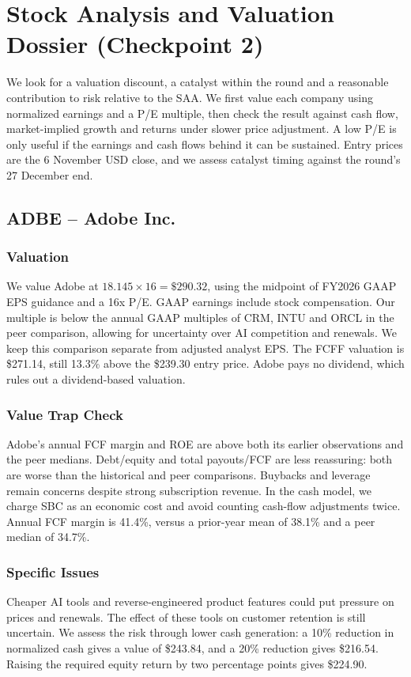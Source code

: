 \documentclass[10pt,a4paper]{article}
\begin{document}
\clearpage
\section{Stock Analysis and Valuation Dossier (Checkpoint 2)}
\label{sec:cp2}

We look for a valuation discount, a catalyst within the round and a reasonable contribution to risk relative to the SAA. We first value each company using normalized earnings and a P/E multiple, then check the result against cash flow, market-implied growth and returns under slower price adjustment. A low P/E is only useful if the earnings and cash flows behind it can be sustained. Entry prices are the 6 November USD close, and we assess catalyst timing against the round's 27 December end.


\subsection{ADBE -- Adobe Inc.}

\subsubsection*{Valuation}
We value Adobe at $18.145\times16=\$290.32$, using the midpoint of FY2026 GAAP EPS guidance and a 16x P/E. GAAP earnings include stock compensation. Our multiple is below the annual GAAP multiples of CRM, INTU and ORCL in the peer comparison, allowing for uncertainty over AI competition and renewals. We keep this comparison separate from adjusted analyst EPS. The FCFF valuation is \$271.14, still 13.3\% above the \$239.30 entry price. Adobe pays no dividend, which rules out a dividend-based valuation.

\subsubsection*{Value Trap Check}
Adobe's annual FCF margin and ROE are above both its earlier observations and the peer medians. Debt/equity and total payouts/FCF are less reassuring: both are worse than the historical and peer comparisons. Buybacks and leverage remain concerns despite strong subscription revenue. In the cash model, we charge SBC as an economic cost and avoid counting cash-flow adjustments twice. Annual FCF margin is 41.4\%, versus a prior-year mean of 38.1\% and a peer median of 34.7\%.

\subsubsection*{Specific Issues}
Cheaper AI tools and reverse-engineered product features could put pressure on prices and renewals. The effect of these tools on customer retention is still uncertain. We assess the risk through lower cash generation: a 10\% reduction in normalized cash gives a value of \$243.84, and a 20\% reduction gives \$216.54. Raising the required equity return by two percentage points gives \$224.90.
\end{document}

